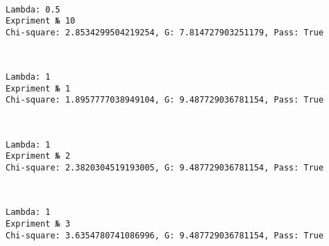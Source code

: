 \documentclass[11pt]{article}
\begin{document}
    \begin{center}
    \end{center}
    { \hspace*{\fill} \\}
    
    \begin{Verbatim}[commandchars=\\\{\}]
Lambda: 0.5
Expriment № 10
Chi-square: 2.8534299504219254, G: 7.814727903251179, Pass: True
    \end{Verbatim}

    \begin{center}
    \end{center}
    { \hspace*{\fill} \\}
    
    \begin{Verbatim}[commandchars=\\\{\}]
Lambda: 1
Expriment № 1
Chi-square: 1.8957777038949104, G: 9.487729036781154, Pass: True
    \end{Verbatim}

    \begin{center}
    \end{center}
    { \hspace*{\fill} \\}
    
    \begin{Verbatim}[commandchars=\\\{\}]
Lambda: 1
Expriment № 2
Chi-square: 2.3820304519193005, G: 9.487729036781154, Pass: True
    \end{Verbatim}

    \begin{center}
    \end{center}
    { \hspace*{\fill} \\}
    
    \begin{Verbatim}[commandchars=\\\{\}]
Lambda: 1
Expriment № 3
Chi-square: 3.6354780741086996, G: 9.487729036781154, Pass: True
    \end{Verbatim}
\end{document}
